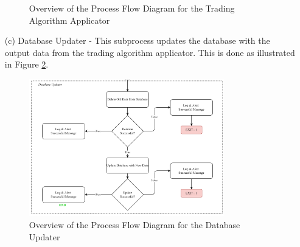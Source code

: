 \begin{itemize}
\begin{figure}[ht]
        \caption{Overview of the Process Flow Diagram for the Trading Algorithm Applicator}
        \label{fig:process_flowchart_dp_trad_algo_applicator}
    \end{figure}
    \FloatBarrier
    \item[(c)] Database Updater - This subprocess updates the database with the output data from
    the trading algorithm applicator. This is done as illustrated in Figure \ref{fig:process_flowchart_db_updater}.
    \begin{figure}[ht]
        \centering
        \includegraphics[width=0.80\textwidth]{./assets/Chapter_3/PFC/ProcessFlowchart_DataProcessor3.png}
        \caption{Overview of the Process Flow Diagram for the Database Updater}
        \label{fig:process_flowchart_db_updater}
    \end{figure}
    \FloatBarrier
\end{itemize}
